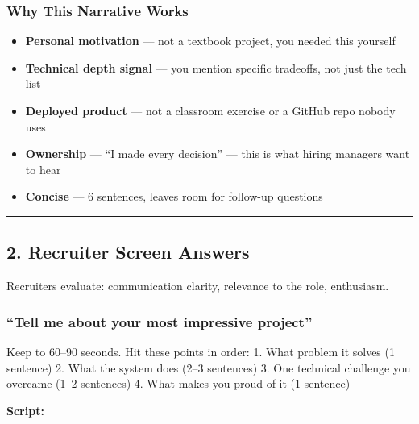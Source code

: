 \documentclass[
  11pt,
]{article}
\providecommand{\tightlist}{%
  \setlength{\itemsep}{0pt}\setlength{\parskip}{0pt}}
\begin{document}
\hypertarget{why-this-narrative-works}{%
\subsubsection{Why This Narrative
Works}\label{why-this-narrative-works}}

\begin{itemize}
\tightlist
\item
  \textbf{Personal motivation} --- not a textbook project, you needed
  this yourself
\item
  \textbf{Technical depth signal} --- you mention specific tradeoffs,
  not just the tech list
\item
  \textbf{Deployed product} --- not a classroom exercise or a GitHub
  repo nobody uses
\item
  \textbf{Ownership} --- ``I made every decision'' --- this is what
  hiring managers want to hear
\item
  \textbf{Concise} --- 6 sentences, leaves room for follow-up questions
\end{itemize}

\begin{center}\rule{0.5\linewidth}{0.5pt}\end{center}

\hypertarget{recruiter-screen-answers}{%
\subsection{2. Recruiter Screen
Answers}\label{recruiter-screen-answers}}

Recruiters evaluate: communication clarity, relevance to the role,
enthusiasm.

\hypertarget{tell-me-about-your-most-impressive-project}{%
\subsubsection{``Tell me about your most impressive
project''}\label{tell-me-about-your-most-impressive-project}}

Keep to 60--90 seconds. Hit these points in order: 1. What problem it
solves (1 sentence) 2. What the system does (2--3 sentences) 3. One
technical challenge you overcame (1--2 sentences) 4. What makes you
proud of it (1 sentence)

\textbf{Script:}
\end{document}
